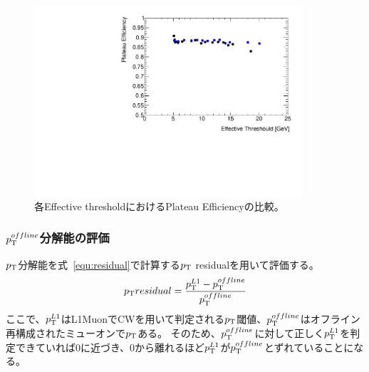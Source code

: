 \begin{figure}[htb]
  \centering
  \includegraphics[clip, width=10cm]{fig/4/v05vsv07_Plateau.pdf}
  \caption{各Effective thresholdにおけるPlateau Efficiencyの比較。}
  \label{Plateau_v07v05}
\end{figure}

\subsubsection{$p_{\rm{T}}^{offline}$分解能の評価}
$p_{\rm{T}}$分解能を式~\eqref{equ:residual}で計算する$p_{\rm{T}}$ residualを用いて評価する。
\begin{equation}
    p_{\rm{T}} residual = \frac{p_{\rm{T}}^{L1}-p_{\rm{T}}^{offline}}{p_{\rm{T}}^{offline}}
    \label{equ:residual}
\end{equation}
ここで、$p_{\rm{T}}^{L1}$はL1MuonでCWを用いて判定される$p_{\rm{T}}$閾値、$p_{\rm{T}}^{offline}$はオフライン再構成されたミューオンで$p_{\rm{T}}$ある。
そのため、$p_{\rm{T}}^{offline}$に対して正しく$p_{\rm{T}}^{L1}$を判定できていれば0に近づき、0から離れるほど$p_{\rm{T}}^{L1}$が$p_{\rm{T}}^{offline}$とずれていることになる。

